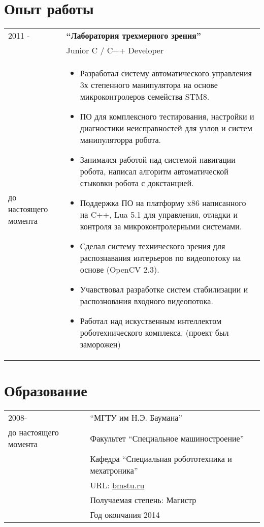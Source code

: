 \documentclass[a4paper, 11pt]{article}
\begin{document}
\section{Опыт работы }
\begin{tabular}{p{25mm}|p{110mm}}
2011 -& \textbf{``Лаборатория трехмерного зрения''} \\
& Junior C / C++ Developer \\
до настоящего момента &
\begin{itemize}
    \item Разработал систему автоматического управления 
    3х степенного манипулятора на основе микроконтролеров семейства STM8.
    \item ПО для комплексного тестирования, настройки и диагностики
    неисправностей для узлов и систем манипуляторра робота.
    \item Занимался работой над системой навигации робота,
    написал алгоритм автоматической стыковки робота с докстанцией.
    \item Поддержка ПО на платформу x86 написанного на C++, Lua 5.1 
    для управления, отладки и контроля за микроконтролерными системами.
    \item Сделал систему технического зрения для 
    распознавания интерьеров по видеопотоку на основе (OpenCV 2.3).
    \item Учавствовал разработке систем стабилизации и
    распознования входного видеопотока.
    \item Работал над искуственным интеллектом роботехнического комплекса.
    (проект был заморожен) 
\end{itemize}
\\
\end{tabular}

\section{Образование}
\begin{tabular}{p{25mm}|p{110mm}}
2008-                 & ``МГТУ им Н.Э. Баумана'' \\ 
до настоящего момента & Факультет ``Специальное машиностроение'' \\
                      & Кафедра ``Специальная робототехника и мехатроника'' \\
                      & URL: \href{http://bmstu.ru}{bmstu.ru} \\
                      & Получаемая степень: Магистр \\
                      & Год окончания 2014
\end{tabular}
\end{document}

